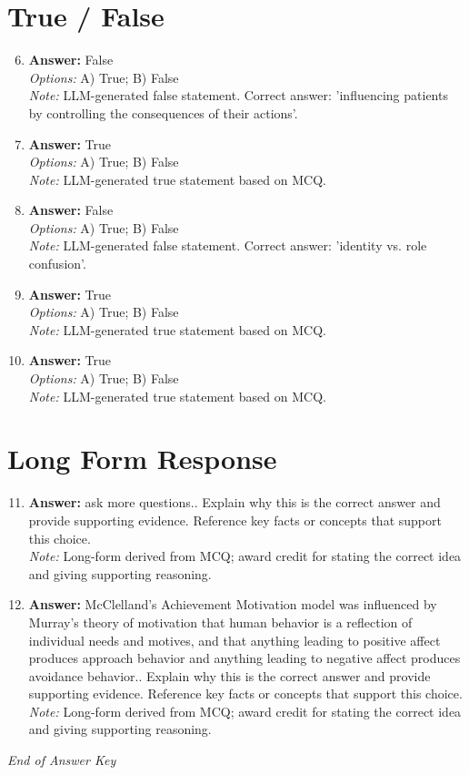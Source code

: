 \documentclass[12pt]{article}
\begin{document}
\section*{True / False}
\begin{enumerate}[label=\arabic*.]
\setcounter{enumi}{5}
\item \textbf{Answer:} False
\\ \textit{Options:} A) True; B) False
\\ \textit{Note:} LLM-generated false statement. Correct answer: 'influencing patients by controlling the consequences of their actions'.
\item \textbf{Answer:} True
\\ \textit{Options:} A) True; B) False
\\ \textit{Note:} LLM-generated true statement based on MCQ.
\item \textbf{Answer:} False
\\ \textit{Options:} A) True; B) False
\\ \textit{Note:} LLM-generated false statement. Correct answer: 'identity vs. role confusion'.
\item \textbf{Answer:} True
\\ \textit{Options:} A) True; B) False
\\ \textit{Note:} LLM-generated true statement based on MCQ.
\item \textbf{Answer:} True
\\ \textit{Options:} A) True; B) False
\\ \textit{Note:} LLM-generated true statement based on MCQ.
\end{enumerate}

\section*{Long Form Response}
\begin{enumerate}[label=\arabic*.]
\setcounter{enumi}{10}
\item \textbf{Answer:} ask more questions.. Explain why this is the correct answer and provide supporting evidence. Reference key facts or concepts that support this choice.
\\ \textit{Note:} Long-form derived from MCQ; award credit for stating the correct idea and giving supporting reasoning.
\item \textbf{Answer:} McClelland's Achievement Motivation model was influenced by Murray's theory of motivation that human behavior is a reflection of individual needs and motives, and that anything leading to positive affect produces approach behavior and anything leading to negative affect produces avoidance behavior.. Explain why this is the correct answer and provide supporting evidence. Reference key facts or concepts that support this choice.
\\ \textit{Note:} Long-form derived from MCQ; award credit for stating the correct idea and giving supporting reasoning.
\end{enumerate}

\vfill
\noindent\textit{End of Answer Key}
\end{document}
